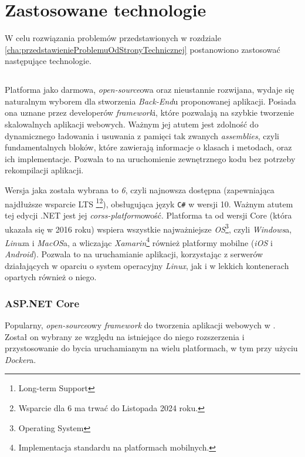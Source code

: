 \chapter{Zastosowane technologie}
\label{cha:zastosowaneTechnologie}

\par W celu rozwiązania problemów przedstawionych w rozdziale \ref{cha:przedstawienieProblemuOdStronyTechnicznej} postanowiono zastosować następujące technologie.

\section{\dotnet{}}

\par Platforma \dotnet{} jako darmowa, \emph{open-source}owa oraz nieustannie rozwijana, wydaje się naturalnym wyborem dla stworzenia \emph{Back-End}u proponowanej aplikacji. Posiada ona uznane przez developerów \emph{framework}i, które pozwalają na szybkie tworzenie skalowalnych aplikacji webowych. Ważnym jej atutem jest zdolność do dynamicznego ładowania i usuwania z pamięci tak zwanych \emph{assemblies}, czyli fundamentalnych bloków, które zawierają informacje o klasach i metodach, oraz ich implementacje. Pozwala to na uruchomienie zewnętrznego kodu bez potrzeby rekompilacji aplikacji.

\par Wersja jaka została wybrana to \emph{\dotnet{} 6}, czyli najnowsza dostępna (zapewniająca najdłuższe wsparcie LTS \footnote{Long-term Support}\footnote{Wsparcie dla \dotnet{} 6 ma trwać do Listopada 2024 roku.}), obsługująca język \verb|C#| w wersji 10. Ważnym atutem tej edycji .NET jest jej \emph{corss-platform}owość. Platforma ta od wersji \dotnet{} Core (która ukazała się w 2016 roku) wspiera wszystkie najważniejsze \emph{OS}\footnote{Operating System}, czyli \emph{Windows}a, \emph{Linux}a i \emph{MacOS}a, a wliczając \emph{Xamarin}\footnote{Implementacja standardu \dotnet{} na platformach mobilnych.} również platformy mobilne (\emph{iOS} i \emph{Android}). Pozwala to na uruchamianie aplikacji, korzystając z serwerów działających w oparciu o system operacyjny \emph{Linux}, jak i w lekkich kontenerach opartych również o niego\cite{DOTNET_DOCUMENTATION}.

\subsection{ASP.NET Core}

\par Popularny, \emph{open-source}owy \emph{framework} do tworzenia aplikacji webowych w \dotnet{}. Został on wybrany ze względu na istniejące do niego rozszerzenia i przystosowanie do bycia uruchamianym na wielu platformach, w tym przy użyciu \emph{Docker}a\cite{ASPNET_DOCUMENTATION}.

